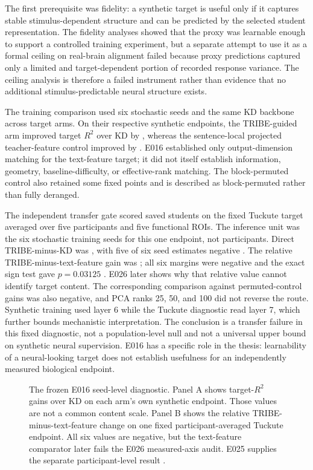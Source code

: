 The first prerequisite was fidelity: a synthetic target is useful only if it captures stable stimulus-dependent structure and can be predicted by the selected student representation.
The fidelity analyses showed that the proxy was learnable enough to support a controlled training experiment, but a separate attempt to use it as a formal ceiling on real-brain alignment failed because proxy predictions captured only a limited and target-dependent portion of recorded response variance. 
The ceiling analysis is therefore a failed instrument rather than evidence that no additional stimulus-predictable neural structure exists.

The training comparison used six stochastic seeds and the same KD backbone across target arms.
On their respective synthetic endpoints, the TRIBE-guided arm improved target $R^2$ over KD by , whereas the sentence-local projected teacher-feature control improved by . 
E016 established only output-dimension matching for the text-feature target; it did not itself establish information, geometry, baseline-difficulty, or effective-rank matching.
The block-permuted control also retained some fixed points and is described as block-permuted rather than fully deranged.

The independent transfer gate scored saved students on the fixed Tuckute target averaged over five participants and five functional ROIs.
The inference unit was the six stochastic training seeds for this one endpoint, not participants.
Direct TRIBE-minus-KD was , with five of six seed estimates negative .
The relative TRIBE-minus-text-feature gain was ; all six margins were negative and the exact sign test gave $p=0.03125$ .
E026 later shows why that relative value cannot identify target content.
The corresponding comparison against permuted-control gains was also negative, and PCA ranks 25, 50, and 100 did not reverse the route.
Synthetic training used layer 6 while the Tuckute diagnostic read layer 7, which further bounds mechanistic interpretation.
The conclusion is a transfer failure in this fixed diagnostic, not a population-level null and not a universal upper bound on synthetic neural supervision.
E016 has a specific role in the thesis: learnability of a neural-looking target does not establish usefulness for an independently measured biological endpoint.

\begin{figure}[H]
  \centering
  \caption{The frozen E016 seed-level diagnostic. Panel A shows target-$R^2$ gains over KD on each arm's own synthetic endpoint. Those values are not a common content scale. Panel B shows the relative TRIBE-minus-text-feature change on one fixed participant-averaged Tuckute endpoint. All six values are negative, but the text-feature comparator later fails the E026 measured-axis audit. E025 supplies the separate participant-level result .}
  \label{fig:synthetic-transfer}
\end{figure}

